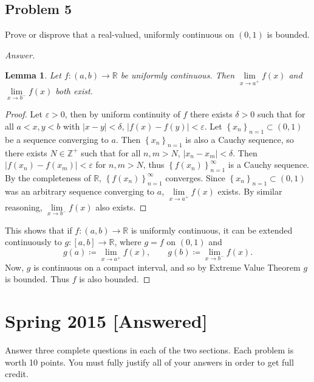 \documentclass[12pt]{article}
\newcommand{\z}{\mathbb{Z}}
\newcommand{\real}{\mathbb{R}}
\newcommand\paren[1]{\left( #1 \right)}
\newcommand\setb[1]{\left \{ #1 \right \}}
\newcommand{\abs}[1]{\left | #1 \right |}
\newcommand{\eps}{\varepsilon}
\newtheorem{lemma}[theorem]{Lemma}
\theoremstyle{definition}
\begin{document}
\subsection{Problem 5 \texorpdfstring{\cite{Leon}}{}}
Prove or disprove that a real-valued, uniformly continuous on $(0,1)$ is bounded.
\begin{proof}[Answer]
    \begin{lemma}
        Let $f : (a,b) \to \real$ be uniformly continuous. Then $\lim\limits_{x \to a^+} f(x)$ and $\lim\limits_{x \to b^-} f(x)$ both exist.
    \end{lemma}
    \begin{proof}
        Let $\eps > 0$, then by uniform continuity of $f$ there exists $\delta > 0$ such that for all $a < x , y < b$ with $|x - y| < \delta$, $|f(x) - f(y)| < \eps$. Let $\setb{ x_n }_{n = 1} \subset (0,1)$ be a sequence converging to $a$. Then $\setb{ x_n }_{n = 1}$ is also a Cauchy sequence, so there exists $N \in \z^+$ such that for all $n , m > N$, $\abs{ x_n - x_m } < \delta$. Then $\abs{ f \paren{ x_n } - f \paren{ x_m } } < \eps$ for $n , m > N$, thus $\setb{ f \paren{ x_n } }_{n = 1}^{\infty}$ is a Cauchy sequence. By the completeness of $\real$, $\setb{ f \paren{ x_n } }_{n = 1}^{\infty}$ converges. Since $\setb{ x_n }_{n = 1} \subset (0,1)$ was an arbitrary sequence converging to $a$, $\lim\limits_{x \to a^+} f(x)$ exists. By similar reasoning, $\lim\limits_{x \to b^-} f(x)$ also exists.
    \end{proof}
    This shows that if $f : (a,b) \to \real$ is uniformly continuous, it can be extended continuously to $g : [a,b] \to \real$, where $g = f$ on $(0,1)$ and
    \[
        g(a) \coloneqq \lim\limits_{x \to a^+} f(x), \qquad g(b) \coloneqq \lim\limits_{x \to b^-} f(x).
    \]
    Now, $g$ is continuous on a compact interval, and so by Extreme Value Theorem $g$ is bounded. Thus $f$ is also bounded.
\end{proof}
\newpage
\section{Spring 2015 [Answered]}
Answer three complete questions in each of the two sections. Each problem is worth 10 points. You must fully justify all of your answers in order to get full credit.
\end{document}
